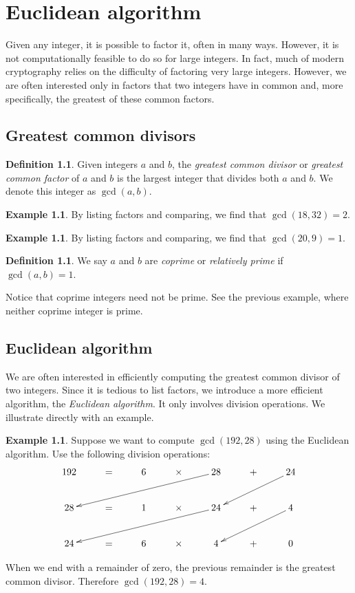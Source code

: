 \documentclass{book}
\theoremstyle{plain}
\theoremstyle{definition}
\newtheorem{definition}[theorem]{Definition}
\newtheorem{example}[theorem]{Example}
\begin{document}
\chapter{Euclidean algorithm}
Given any integer, it is possible to factor it, often in many ways. However, it is not computationally feasible to do so for large integers. In fact, much of modern cryptography relies on the difficulty of factoring very large integers. However, we are often interested only in factors that two integers have in common and, more specifically, the greatest of these common factors.

\section{Greatest common divisors}
\begin{definition}
Given integers $a$ and $b$, the {\it greatest common divisor} or {\it greatest common factor} of $a$ and $b$ is the largest integer that divides both $a$ and $b$. We denote this integer as $\gcd(a,b)$.
\end{definition}

\begin{example}
By listing factors and comparing, we find that $\gcd(18,32) = 2$.
\end{example}

\begin{example}
By listing factors and comparing, we find that $\gcd(20,9) = 1$.
\end{example}

\begin{definition}
We say $a$ and $b$ are {\it coprime} or {\it relatively prime} if $\gcd(a,b) = 1$.
\end{definition}

Notice that coprime integers need not be prime. See the previous example, where neither coprime integer is prime.

\section{Euclidean algorithm}
We are often interested in efficiently computing the greatest common divisor of two integers. Since it is tedious to list factors, we introduce a more efficient algorithm, the {\it Euclidean algorithm}. It only involves division operations. We illustrate directly with an example.

\begin{example}
Suppose we want to compute $\gcd(192,28)$ using the Euclidean algorithm. Use the following division operations:
$$\xymatrix{ 192 & = & 6 & \times & 28 \ar[dllll] & + & 24 \ar[dll] \\
28 & = & 1 & \times & 24 \ar[dllll] & + & 4 \ar[dll] \\
24 & = & 6 & \times & 4 & + & 0 }$$

When we end with a remainder of zero, the previous remainder is the greatest common divisor. Therefore $\gcd(192,28) = 4$.
\end{example}
\end{document}
